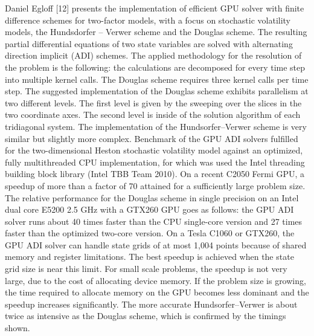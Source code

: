 Daniel Egloff [12] presents the implementation of efficient GPU solver with finite difference schemes for two-factor models, with a focus on stochastic volatility models, the Hundsdorfer – Verwer scheme and the Douglas scheme. The resulting partial differential equations of two state variables are solved with alternating direction implicit (ADI) schemes. The applied methodology for the resolution of the problem is the following: the calculations are decomposed for every time step into multiple kernel calls. The Douglas scheme requires three kernel calls per time step. The suggested implementation of the Douglas scheme exhibits parallelism at two different levels. The first level is given by the sweeping over the slices in the two coordinate axes. The second level is inside of the solution algorithm of each tridiagonal system. The implementation of the Hundsorfer–Verwer scheme is very similar but slightly more complex. Benchmark of the GPU ADI solvers fulfilled for the two-dimensional Heston stochastic volatility model against an optimized, fully multithreaded CPU implementation, for which was used the Intel threading building block library (Intel TBB Team 2010). On a recent C2050 Fermi GPU, a speedup of more than a factor of 70 attained for a sufficiently large problem size. The relative performance for the Douglas scheme in single precision on an Intel dual core E5200 2.5 GHz with a GTX260 GPU goes as follows: the GPU ADI solver runs about 40 times faster than the CPU single-core version and 27 times faster than the optimized two-core version. On a Tesla C1060 or GTX260, the GPU ADI solver can handle state grids of at most 1,004 points because of shared memory and register limitations. The best speedup is achieved when the state grid size is near this limit. For small scale problems, the speedup is not very large, due to the cost of allocating device memory. If the problem size is growing, the time required to allocate memory on the GPU becomes less dominant and the speedup increases significantly. The more accurate Hundsorfer–Verwer is about twice as intensive as the Douglas scheme, which is confirmed by the timings shown.

